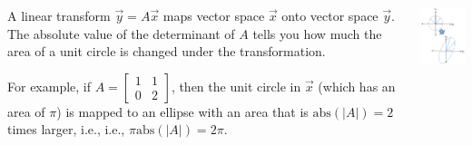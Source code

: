 \documentclass{beamer}
\begin{document}
\begin{frame}
  \begin{columns}[t]
    \column{2.75in}
    \begin{block}{}
      A linear transform $\vec{y}=A\vec{x}$ maps vector
      space $\vec{x}$ onto vector space $\vec{y}$.  The absolute value of the
      determinant of $A$ tells you how much the area of a unit circle is
      changed under the transformation.
      
      For example, if
      $A=\left[\begin{array}{cc}1&1\\0&2\end{array}\right]$, then the
      unit circle in $\vec{x}$ (which has an area of $\pi$) is mapped to
      an ellipse with an area that is $\mbox{abs}(|A|)=2$ times larger, i.e.,
      i.e., $\pi\mbox{abs}(|A|)=2\pi$.
    \end{block}
    \column{1.5in}
    \begin{block}{}
      \includegraphics[width=1.45in]{linalg_review_fig1.png}
    \end{block}
  \end{columns}
\end{frame}
\end{document}

